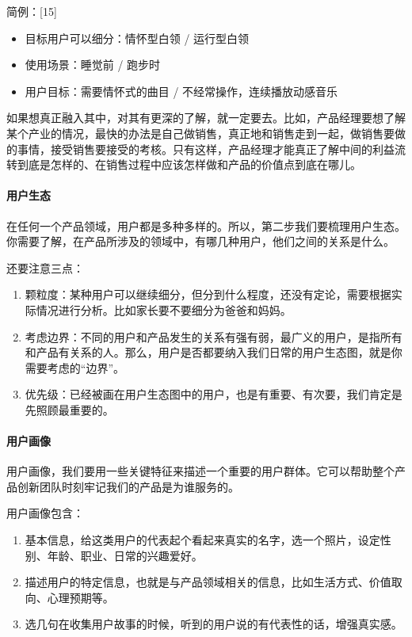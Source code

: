 \documentclass[letterpaper,11pt,english]{sphinxmanual}
\begin{document}
简例：{[}15{]}
\begin{itemize}
\item {} 
目标用户可以细分：情怀型白领 / 运行型白领

\item {} 
使用场景：睡觉前 / 跑步时

\item {} 
用户目标：需要情怀式的曲目 / 不经常操作，连续播放动感音乐

\end{itemize}

如果想真正融入其中，对其有更深的了解，就一定要去。比如，产品经理要想了解某个产业的情况，最快的办法是自己做销售，真正地和销售走到一起，做销售要做的事情，接受销售要接受的考核。只有这样，产品经理才能真正了解中间的利益流转到底是怎样的、在销售过程中应该怎样做和产品的价值点到底在哪儿。


\paragraph{用户生态}
\label{\detokenize{chapter_knowledge/users_analysis:id11}}
在任何一个产品领域，用户都是多种多样的。所以，第二步我们要梳理用户生态。你需要了解，在产品所涉及的领域中，有哪几种用户，他们之间的关系是什么。

还要注意三点：
\begin{enumerate}
%
\item {} 
颗粒度：某种用户可以继续细分，但分到什么程度，还没有定论，需要根据实际情况进行分析。比如家长要不要细分为爸爸和妈妈。

\item {} 
考虑边界：不同的用户和产品发生的关系有强有弱，最广义的用户，是指所有和产品有关系的人。那么，用户是否都要纳入我们日常的用户生态图，就是你需要考虑的“边界”。

\item {} 
优先级：已经被画在用户生态图中的用户，也是有重要、有次要，我们肯定是先照顾最重要的。

\end{enumerate}


\paragraph{用户画像}
\label{\detokenize{chapter_knowledge/users_analysis:id12}}
用户画像，我们要用一些关键特征来描述一个重要的用户群体。它可以帮助整个产品创新团队时刻牢记我们的产品是为谁服务的。

用户画像包含：
\begin{enumerate}
%
\item {} 
基本信息，给这类用户的代表起个看起来真实的名字，选一个照片，设定性别、年龄、职业、日常的兴趣爱好。

\item {} 
描述用户的特定信息，也就是与产品领域相关的信息，比如生活方式、价值取向、心理预期等。

\item {} 
选几句在收集用户故事的时候，听到的用户说的有代表性的话，增强真实感。

\end{enumerate}
\end{document}
